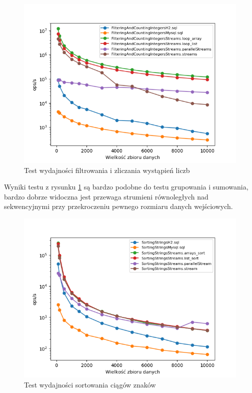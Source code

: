 \documentclass[12pt,twoside,openright]{extarticle}
\begin{document}
\newpage
\begin{figure}[H]
\centering
\includegraphics[width=15cm]{plots/FilteringAndCountingIntegers}
\caption{Test wydajności filtrowania i zliczania wystąpień liczb}
    \label{fig:filteringandcountingintegers}
\end{figure}

    Wyniki testu z rysunku \ref{fig:filteringandcountingintegers} są bardzo podobne do testu grupowania i sumowania, bardzo dobrze widoczna jest przewaga strumieni równoległych nad sekwencyjnymi przy przekroczeniu pewnego rozmiaru danych wejściowych.

\newpage
\begin{figure}[H]
\centering
\includegraphics[width=15cm]{plots/SortingStrings}
\caption{Test wydajności sortowania ciągów znaków}
    \label{fig:sortingstrings}
\end{figure}
\end{document}
